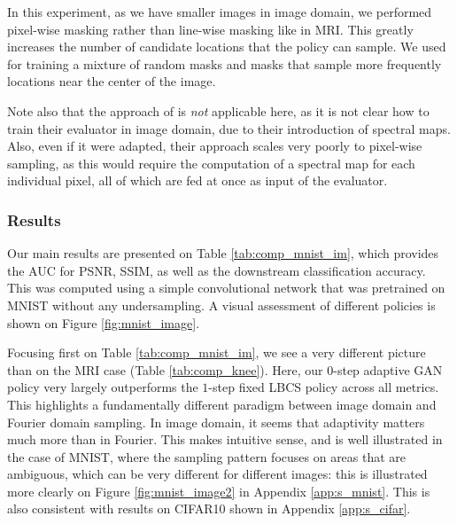 In this experiment, as we have smaller images in image domain, we performed pixel-wise masking rather than line-wise masking like in MRI. This greatly increases the number of candidate locations that the policy can sample. We used for training a mixture of random masks and masks that sample more frequently locations near the center of the image. 

Note also that the approach of \citet{zhang2019reducing} is \textit{not} applicable here, as it is not clear how to train their evaluator in image domain, due to their introduction of spectral maps. Also, even if it were adapted, their approach scales very poorly to pixel-wise sampling, as this would require the computation of a spectral map for each individual pixel, all of which are fed at once as input of the evaluator. 

\subsubsection{Results}
Our main results are presented on Table \ref{tab:comp_mnist_im}, which provides the AUC for PSNR, SSIM, as well as the downstream classification accuracy. This was computed using a simple convolutional network that was pretrained on MNIST without any undersampling. A visual assessment of different policies is shown on Figure \ref{fig:mnist_image}.

Focusing first on Table \ref{tab:comp_mnist_im}, we see a very different picture than on the MRI case (Table \ref{tab:comp_knee}). Here, our $0$-step adaptive GAN policy very largely outperforms the $1$-step fixed LBCS policy across all metrics. This highlights a fundamentally different paradigm between image domain and Fourier domain sampling. In image domain, it seems that adaptivity matters much more than in Fourier. This makes intuitive sense, and is well illustrated in the case of MNIST, where the sampling pattern focuses on areas that are ambiguous, which can be very different for different images: this is illustrated more clearly on Figure \ref{fig:mnist_image2} in Appendix \ref{app:s_mnist}. This is also consistent with results on CIFAR10 shown in Appendix \ref{app:s_cifar}.

